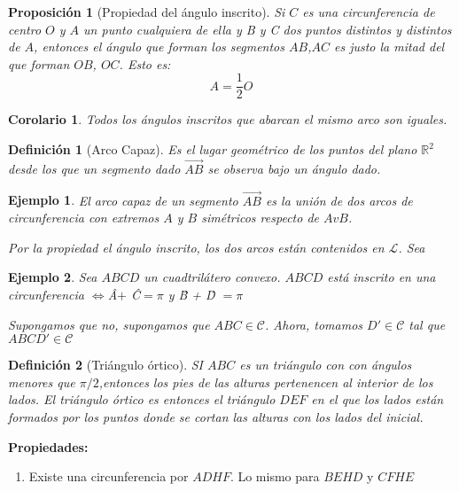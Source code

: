 \documentclass[11pt, a4paper]{article}
\makeatletter
\newif\IfInSansMode
\let\oldsf\sffamily
\renewcommand*{\sffamily}{\oldsf\mathversion{sans}\InSansModetrue}
\let\oldnorm\normalfont
\renewcommand*{\normalfont}{\oldnorm\InSansModefalse\mathversion{normal}}
\renewenvironment{proof}[1][\proofname] {\vspace{-15pt}\par\pushQED{\qed}\normalfont\topsep6\p@\@plus6\p@\relax\trivlist\item[\hskip\labelsep\it#1\@addpunct{.}]\ignorespaces}{\popQED\endtrivlist\@endpefalse}
\newcommand{\R}{\mathbb{R}}
\renewcommand{\vec}{\overrightarrow}
\renewenvironment{proof}[1][\proofname] {\par\pushQED{\qed}\normalfont\topsep6\p@\@plus6\p@\relax\trivlist\item[\hskip\labelsep\itshape\sffamily#1\@addpunct{.}]\ignorespaces}{\popQED\endtrivlist\@endpefalse}
\theoremstyle{theorem-style}
\newtheorem{nprop}{Proposición}[section]
\newtheorem{ncor}{Corolario}[section]
\theoremstyle{definition-style}
\newtheorem{ndef}{Definición}[section]
\theoremstyle{remark-style}
\theoremstyle{example-style}
\newtheorem{ejemplo}{Ejemplo}[section]
\newenvironment{nlist}
{\begin{enumerate}
    \renewcommand\labelenumi{(\emph{\roman{enumi})}}}
  {\end{enumerate}}
\makeatother
\begin{document}
\begin{nprop}[Propiedad del ángulo inscrito]
  Si $C$ es una circunferencia de centro $O$ y $A$ un punto cualquiera de ella y B y C dos puntos distintos y distintos de $A$, entonces el ángulo que forman los segmentos $AB$,$AC$ es justo la mitad del que forman $OB$, $OC$. Esto es:
  \[
    A = \dfrac{1}{2} O
  \]
\end{nprop}
\begin{ncor}
  Todos los ángulos inscritos que abarcan el mismo arco son iguales.
\end{ncor}

\begin{ndef}[Arco Capaz]
	Es el lugar geométrico de los puntos del plano $\R^2$ desde los que un segmento dado $\vec{AB}$ se observa bajo un ángulo dado.
\end{ndef}

\begin{ejemplo}
	El arco capaz de un segmento $\vec{AB}$ es la unión de dos arcos de circunferencia con extremos $A$ y $B$ simétricos respecto de $AvB$.
	
	\begin{proof}[Solución]
	Por la propiedad el ángulo inscrito, los dos arcos están contenidos en $\mathcal L$. Sea 
	
\end{proof}
\end{ejemplo}
\begin{ejemplo}
	Sea $ABCD$ un cuadtrilátero convexo. $ABCD$ está inscrito en una circunferencia $\iff $\^{A}$ +$ \^{C}$ = \pi$ y \^{B} + \^{D} $ = \pi$
	\begin{proof}
	Supongamos que no, supongamos que $ABC \in \mathcal C$. Ahora, tomamos $D' \in \mathcal C$ tal que $ABCD' \in \mathcal C $
\end{proof}
\end{ejemplo}

\begin{ndef}[Triángulo órtico]
	SI $ABC$ es un triángulo con con ángulos menores que $\pi/2$,entonces los pies de las alturas pertenencen al interior de los lados. El triángulo órtico es entonces el triángulo $DEF$ en el que los lados están formados por los puntos donde se cortan las alturas con los lados del inicial.
\end{ndef}

\textbf{Propiedades:}\\
\begin{nlist}
	\item Existe una circunferencia por $ADHF$. Lo mismo para $BEHD$ y $CFHE$
\end{nlist}
\end{document}

